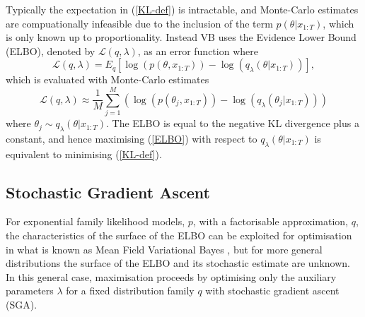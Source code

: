 \documentclass[12pt,a4paper]{article}\usepackage[]{graphicx}\usepackage[]{color}
\begin{document}
Typically the expectation in (\ref{KL-def}) is intractable, and Monte-Carlo estimates are compuationally infeasible due to the inclusion of the term $p(\theta | x_{1:T})$, which is only known up to proportionality. Instead VB uses the Evidence Lower Bound (ELBO), denoted by $\mathcal{L}(q, \lambda)$, as an error function where
\begin{equation}
\label{ELBO}
\mathcal{L}(q, \lambda) = E_q \left[\log(p(\theta, x_{1:T})) - \log(q_{\lambda}(\theta | x_{1:T}))\right],
\end{equation}
which is evaluated with Monte-Carlo estimates
\begin{equation}
\label{ELBO-MC}
\mathcal{L}(q, \lambda) \approx \frac{1}{M} \sum_{j=1}^M \left(\log(p(\theta_{j}, x_{1:T})) - \log(q_{\lambda}(\theta_{j} | x_{1:T})) \right)
\end{equation}
where $\theta_{j} \sim q_{\lambda}(\theta | x_{1:T})$. The ELBO is equal to the negative KL divergence plus a constant, and hence maximising (\ref{ELBO}) with respect to $q_{\lambda}(\theta | x_{1:T})$ is equivalent to minimising (\ref{KL-def}).

\subsection{Stochastic Gradient Ascent}
\label{subsec:SGA}
For exponential family likelihood models, $p$, with a factorisable approximation, $q$, the characteristics of the surface of the ELBO can be exploited for optimisation in what is known as Mean Field Variational Bayes \citep{Jordan1999, Ghahramani2000, Wainwright2008}, but for more general distributions the surface of the ELBO and its stochastic estimate are unknown. In this general case, maximisation proceeds by optimising only the auxiliary parameters $\lambda$ for a fixed distribution family $q$ with stochastic gradient ascent (SGA).
\\
\end{document}
